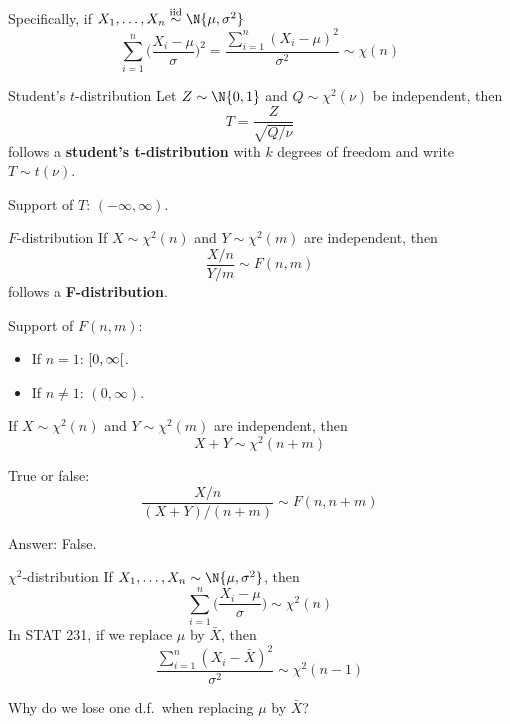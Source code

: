 Specifically, if $ X_1,\ldots,X_n\stackrel{\text{iid}}{\sim}\N{\mu,\sigma^2} $
\[ \sum_{i=1}^{n} \biggl(\frac{X_i-\mu}{\sigma}\biggr)^2=
    \frac{\sum_{i=1}^{n} (X_i-\mu)^2}{\sigma^2}\sim \chi(n)  \]
\begin{Definition}{Student's $ t $-distribution}{}
    Let $ Z \sim \N{0,1} $ and $ Q \sim \chi^2(\nu) $
    be independent, then
    \[ T=\frac{Z}{\sqrt{Q/\nu}}  \]
    follows a \textbf{student's t-distribution}
    with $ k $ degrees of freedom and write
    $ T \sim t(\nu) $.

    Support of $ T $: $ (-\infty,\infty) $.
\end{Definition}
\begin{Definition}{$ F $-distribution}{}
    If $ X \sim \chi^2(n) $ and $ Y \sim \chi^2(m) $
    are independent, then
    \[ \frac{X/n}{Y/m} \sim F(n,m) \]
    follows a \textbf{F-distribution}.

    Support of $ F(n,m) $:
    \begin{itemize}
        \item If $ n=1 $: $ \interval[open right]{0}{\infty} $.
        \item If $ n\neq 1 $: $ (0,\infty) $.
    \end{itemize}
\end{Definition}
If $ X \sim \chi^2(n) $ and $ Y \sim \chi^2(m) $ are independent,
then
\[ X+Y \sim \chi^2(n+m) \]
\begin{Exercise}{}{}
    True or false:
    \[ \frac{X/n}{(X+Y)/(n+m)} \sim F(n,n+m) \]
\end{Exercise}
Answer: False.
\begin{Example}{$ \chi^2 $-distribution}{}
    If $ X_1,\ldots,X_n \sim \N{\mu,\sigma^2} $, then
    \[ \sum_{i=1}^{n} \biggl(\frac{X_i-\mu}{\sigma} \biggr) \sim \chi^2(n) \]
    In STAT 231, if we replace $ \mu $ by $ \bar{X} $, then
    \[ \frac{\sum_{i=1}^{n} (X_i-\bar{X})^2}{\sigma^2} \sim \chi^2(n-1)  \]
\end{Example}
Why do we lose one d.f.\ when replacing $ \mu $ by $ \bar{X} $?
